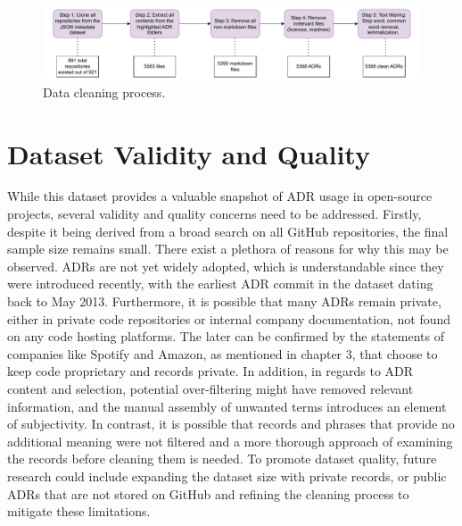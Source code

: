         \begin{figure}[ht]
            \centering
            \includegraphics[width=\textwidth]{figures/data_cleaning_steps_final2.pdf}
            \caption{Data cleaning process.}
            \label{fig:Data_cleaning_steps}
        \end{figure}
        
    \section{Dataset Validity and Quality}
    While this dataset provides a valuable snapshot of ADR usage in open-source projects, several validity and quality concerns need to be addressed. Firstly, despite it being derived from a broad search on all GitHub repositories, the final sample size remains small. There exist a plethora of reasons for why this may be observed. ADRs are not yet widely adopted, which is understandable since they were introduced recently, with the earliest ADR commit in the dataset dating back to May 2013. Furthermore, it is possible that many ADRs remain private, either in private code repositories or internal company documentation, not found on any code hosting platforms. The later can be confirmed by the statements of companies like Spotify and Amazon, as mentioned in chapter 3, that choose to keep code proprietary and records private.
    In addition, in regards to ADR content and selection, potential over-filtering might have removed relevant information, and the manual assembly of unwanted terms introduces an element of subjectivity. In contrast, it is possible that records and phrases that provide no additional meaning were not filtered and a more thorough approach of examining the records before cleaning them is needed. To promote dataset quality, future research could include expanding the dataset size with private records, or public ADRs that are not stored on GitHub and refining the cleaning process to mitigate these limitations.